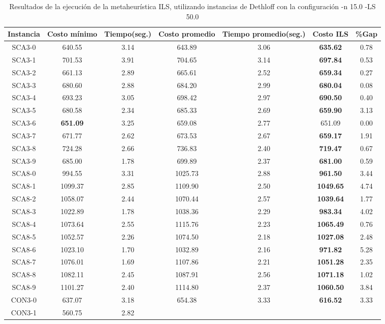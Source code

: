 \begin{table}[ht]
\caption{Resultados de la ejecución de la metaheurística ILS, utilizando instancias de Dethloff con la configuración -n 15.0 -LS 50.0}
\centering
\small
\begin{tabular}{c c c c c c c}
\hline\hline
Instancia & Costo mínimo & Tiempo(seg.) & Costo promedio & Tiempo promedio(seg.) & Costo ILS & \%Gap \\ [0.5ex]
\hline
SCA3-0 & 640.55 & 3.14 & 
643.89 & 3.06 & \bf{635.62} & 
0.78\\SCA3-1 & 701.53 & 3.91 & 
704.65 & 3.14 & \bf{697.84} & 
0.53\\SCA3-2 & 661.13 & 2.89 & 
665.61 & 2.52 & \bf{659.34} & 
0.27\\SCA3-3 & 680.60 & 2.88 & 
684.20 & 2.99 & \bf{680.04} & 
0.08\\SCA3-4 & 693.23 & 3.05 & 
698.42 & 2.97 & \bf{690.50} & 
0.40\\SCA3-5 & 680.58 & 2.34 & 
685.33 & 2.69 & \bf{659.90} & 
3.13\\SCA3-6 & \bf{651.09} & 3.25 & 
659.08 & 2.77 & 651.09 & 0.00\\
SCA3-7 & 671.77 & 2.62 & 
673.53 & 2.67 & \bf{659.17} & 
1.91\\SCA3-8 & 724.28 & 2.66 & 
736.83 & 2.40 & \bf{719.47} & 
0.67\\SCA3-9 & 685.00 & 1.78 & 
699.89 & 2.37 & \bf{681.00} & 
0.59\\SCA8-0 & 994.55 & 3.31 & 
1025.73 & 2.88 & \bf{961.50} & 
3.44\\SCA8-1 & 1099.37 & 2.85 & 
1109.90 & 2.50 & \bf{1049.65} & 
4.74\\SCA8-2 & 1058.07 & 2.44 & 
1070.44 & 2.57 & \bf{1039.64} & 
1.77\\SCA8-3 & 1022.89 & 1.78 & 
1038.36 & 2.29 & \bf{983.34} & 
4.02\\SCA8-4 & 1073.64 & 2.55 & 
1115.76 & 2.23 & \bf{1065.49} & 
0.76\\SCA8-5 & 1052.57 & 2.26 & 
1074.50 & 2.18 & \bf{1027.08} & 
2.48\\SCA8-6 & 1023.10 & 1.70 & 
1032.89 & 2.16 & \bf{971.82} & 
5.28\\SCA8-7 & 1076.01 & 1.69 & 
1107.86 & 2.21 & \bf{1051.28} & 
2.35\\SCA8-8 & 1082.11 & 2.45 & 
1087.91 & 2.56 & \bf{1071.18} & 
1.02\\SCA8-9 & 1101.27 & 2.40 & 
1114.80 & 2.37 & \bf{1060.50} & 
3.84\\CON3-0 & 637.07 & 3.18 & 
654.38 & 3.33 & \bf{616.52} & 
3.33\\CON3-1 & 560.75 & 2.82 & 

\end{tabular}
\end{table}
